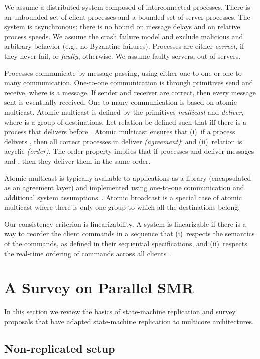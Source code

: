 \documentclass[conference]{IEEEtran}
\begin{document}
We assume a distributed system composed of interconnected processes. There is an unbounded set  of client processes and a bounded set  of server processes. The system is asynchronous: there is no bound on message delays and on relative process speeds. We assume the crash failure model and exclude malicious and arbitrary behavior (e.g., no Byzantine failures). Processes are either \emph{correct}, if they never fail, or \emph{faulty}, otherwise. We assume  faulty servers, out of  servers. 

Processes communicate by message passing, using either one-to-one or one-to-many communication. One-to-one communication is through primitives send and receive, where  is a message. If sender and receiver are correct, then every message sent is eventually received. 
One-to-many communication is based on atomic multicast. Atomic multicast is defined by the primitives \emph{multicast} and \emph{deliver}, where  is a group of destinations.
Let relation  be defined such that  iff there is a process that delivers  before .
Atomic multicast ensures that 
(i)~if a process delivers , then all correct processes in  deliver  \emph{(agreement)}; and
(ii)~relation  is acyclic \emph{(order)}.
The order property implies that if processes  and  deliver messages  and , then they deliver them in the same order.

Atomic multicast is typically available to applications as a library (encapsulated as an agreement layer) and implemented using one-to-one communication and additional system assumptions~\cite{CT96,Lam98}. Atomic broadcast is a special case of atomic multicast where there is only one group to which all the destinations belong. 

Our consistency criterion is linearizability.
A system is linearizable if there is a way to reorder the client commands in a sequence that (i)~respects the semantics of the commands, as defined in their sequential specifications, and (ii)~respects the real-time ordering of commands across all clients~\cite{Attiya04}. 


\section{A Survey on Parallel SMR}
\label{sec:survey}
In this section we review the basics of state-machine replication and survey proposals that have adapted state-machine replication to multicore architectures. 

\subsection{Non-replicated setup}
\end{document}
